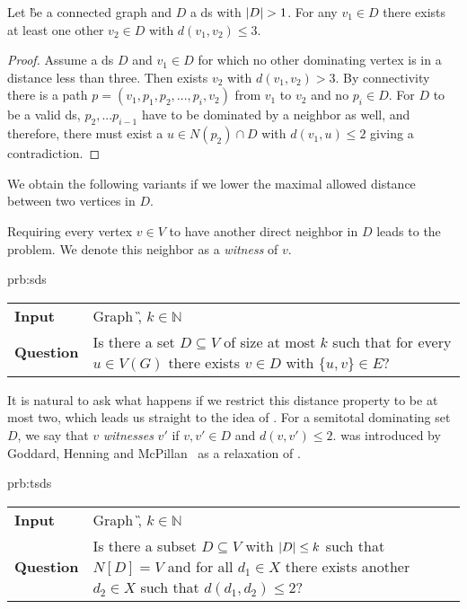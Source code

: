 \begin{fact}\label{fact:distance} Let \G be a connected graph and $D$ a ds with $\abs{D} > 1$. 
For any $v_1 \in D$ there exists at least one other $v_2 \in D$ with $d(v_1,v_2) \leq 3$.
\end{fact}
\begin{proof}

Assume a ds $D$ and $v_1 \in D$ for which no other dominating vertex is in a distance less than three.
Then exists $v_2$ with $d(v_1,v_2) > 3$. 
By connectivity there is a path $p = (v_1, p_1, p_2, ...,  p_i, v_2)$ from $v_1$ to $v_2$ and no $p_i \in D $. 
For $D$ to be a valid ds, $p_2,...p_{i-1}$ have to be dominated by a neighbor as well, and therefore, there must exist a $u \in N(p_2) \cap D$ with $d(v_1, u) \leq 2$ giving a contradiction.
\end{proof}
We obtain the following variants if we lower the maximal allowed distance between two vertices in $D$.

Requiring every vertex $v \in V$ to have another direct neighbor in $D$ leads to the \tdom problem. 
We denote this neighbor as a \textit{witness} of $v$.

\begin{prb}{prb:sds}
    \begin{tabularx}{1.0\textwidth}{>{\hsize=0.30\hsize}X>{\hsize=0.8\hsize}X}
        \textbf{Input} & Graph \G, $k \in \mathbb{N}$\\
        \textbf{Question} & Is there a set $D \subseteq V$ of size at most $k$ such that for every $u \in V(G)$ there exists $v \in D$ with $\{u,v\} \in E$? \\
    \end{tabularx}
\end{prb}

It is natural to ask what happens if we restrict this distance property to be at most two, which leads us straight to the idea of \sdomin.
For a semitotal dominating set $D$, we say that $v$ \emph{witnesses} $v'$ if $v, v' \in D$ and $d(v,v') \leq 2$.
\sdomin was introduced by Goddard, Henning and McPillan~\cite{Goddard2014} as a relaxation of \tdomin. 

\begin{prb}{prb:tsds}
    \begin{tabularx}{1.0\textwidth}{>{\hsize=0.30\hsize}X>{\hsize=0.8\hsize}X}
        \textbf{Input} & Graph \G, $k \in \mathbb{N}$\\
        \textbf{Question} & Is there a subset $D \subseteq V$ with $\abs{D} \leq k$ such that ${N[D] = V}$ and for all $d_1 \in X$ there exists another $d_2 \in X$ such that ${d(d_1, d_2) \leq 2}$?\\
    \end{tabularx}
\end{prb}


